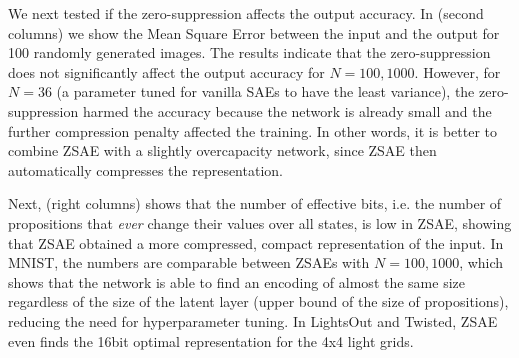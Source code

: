 We next tested if the zero-suppression affects the output accuracy.
In  (second columns)
we show the Mean Square Error between the input and the output
for 100 randomly generated images.
The results indicate that the zero-suppression does not significantly affect the output accuracy for $N=100,1000$.
However, for $N=36$ (a parameter tuned for vanilla SAEs to have the least variance), the zero-suppression
harmed the accuracy because the network is already small and the further compression penalty affected the training.
In other words, it is better to combine ZSAE with a slightly overcapacity network,
since ZSAE then automatically compresses the representation.

Next,  (right columns) shows that the number of effective bits,
i.e. the number of propositions that \emph{ever} change their values over all states, is low in ZSAE, showing that
ZSAE obtained a more compressed, compact representation of the input.
In MNIST, the numbers are comparable between ZSAEs with $N=100,1000$,
which shows that the network is able to find an encoding of almost the same size
regardless of the size of the latent layer (upper bound of the size of
propositions), reducing the need for hyperparameter tuning.
In LightsOut and Twisted, ZSAE even finds the 16bit optimal representation for the 4x4 light grids.


